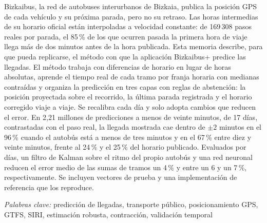 \noindent Bizkaibus, la red de autobuses interurbanos de Bizkaia, publica la posición GPS de cada vehículo y su
próxima parada, pero no su retraso. Las horas intermedias de su horario oficial están interpoladas a velocidad
constante: de 169\,308 pasos reales por parada, el 85\,\% de los que ocurren pasada la primera hora de viaje llega más
de dos minutos antes de la hora publicada. Esta memoria describe, para que pueda replicarse, el método con que la
aplicación Bizkaibus+ predice las llegadas. El método trabaja con diferencias de horario en lugar
de horas absolutas, aprende el tiempo real de cada tramo por franja horaria con medianas contraídas
y organiza la predicción en tres capas con reglas de abstención: la posición
proyectada sobre el recorrido, la última parada registrada y el horario corregido viaje a viaje. Se recalibra cada día y solo
adopta cambios que reducen el error. En 2,21 millones de predicciones a menos de veinte minutos, de 17 días,
contrastadas con el paso real, la llegada mostrada cae dentro de $\pm2$ minutos en el 96\,\% cuando el autobús está a
menos de tres minutos y en el 67\,\% entre diez y veinte minutos, frente al 24\,\% y el 25\,\% del horario publicado.
Evaluados por días, un filtro de Kalman sobre el ritmo del propio autobús y una red neuronal reducen el error medio de
las sumas de tramos un 4\,\% y entre un 6 y un 7\,\%, respectivamente. Se incluyen vectores de prueba y una
implementación de referencia que los reproduce.

\textit{Palabras clave:} predicción de llegadas, transporte público, posicionamiento GPS, GTFS, SIRI, estimación
robusta, contracción, validación temporal

